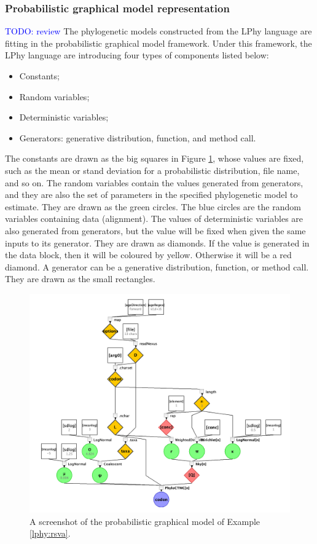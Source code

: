 \documentclass[10pt,letterpaper,table]{article}
\begin{document}
\subsubsection{Probabilistic graphical model representation}
\textcolor{blue}{TODO: review}
The phylogenetic models constructed from the LPhy language are fitting in the probabilistic graphical model framework\cite{}.
Under this framework, the LPhy language are introducing four types of components listed below:

\begin{itemize}
    \item Constants;
    \item Random variables;
    \item Deterministic variables;
    \item Generators: generative distribution, function, and method call.
\end{itemize}

The constants are drawn as the big squares in Figure \ref{fig:RSV2PGM}, whose values are fixed, such as the mean or stand deviation for a probabilistic distribution, file name, and so on. 
The random variables contain the values generated from generators, and they are also the set of parameters in the specified phylogenetic model to estimate. They are drawn as the green circles. The blue circles are the random variables containing data (alignment).
The values of deterministic variables are also generated from generators, but the value will be fixed when given the same inputs to its generator. They are drawn as diamonds. If the value is generated in the data block, then it will be coloured by yellow. Otherwise it will be a red diamond.
A generator can be a generative distribution, function, or method call. They are drawn as the small rectangles.

\begin{figure}
  \includegraphics[width=\textwidth]{figs/RSV2.png}
  \caption{A screenshot of the probabilistic graphical model of Example \ref{lphy:rsva}.} 
  \label{fig:RSV2PGM}
\end{figure}
\end{document}
